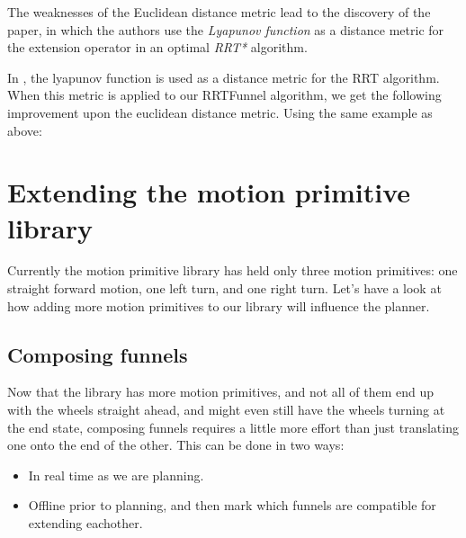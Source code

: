 The weaknesses of the Euclidean distance metric lead to the discovery of the
\cite{parkFeedbackMotionPlanning2015} paper, in which the authors use the
\textit{Lyapunov function} as a distance metric for the extension operator in an
optimal \textit{RRT*} algorithm.

In \cite{parkFeedbackMotionPlanning2015}, the lyapunov function is used as a
distance metric for the RRT algorithm. When this metric is applied to our
RRTFunnel algorithm, we get the following improvement upon the euclidean
distance metric. Using the same example as above:



\section{Extending the motion primitive library}

Currently the motion primitive library has held only three motion primitives:
one straight forward motion, one left turn, and one right turn. Let's have a
look at how adding more motion primitives to our library will influence the
planner.

\subsection{Composing funnels}

Now that the library has more motion primitives, and not all of them end up with
the wheels straight ahead, and might even still have the wheels turning at the
end state, composing funnels requires a little more effort than just
translating one onto the end of the other. This can be done in two ways:
\begin{itemize}
  \item In real time as we are planning.
  \item Offline prior to planning, and then mark which funnels are compatible
    for extending eachother.
\end{itemize}